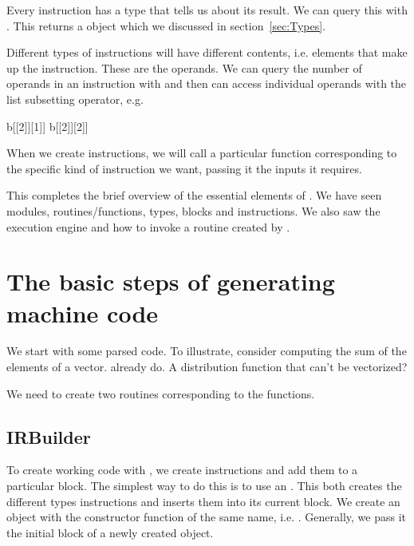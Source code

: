 \documentclass[article]{jss}
\begin{document}
Every instruction has a type that tells us about its result. 
We can query this with . This returns a
 object which we discussed in section~\ref{sec:Types}.

Different types of instructions will have different contents,
i.e. elements that make up the instruction.
These are the operands.
We can query the number of operands in an instruction with 
and then can access individual operands with the  list subsetting
operator, e.g.
\begin{RCode}
b[[2]][1]]
b[[2]][2]]
\end{RCode}
When we create instructions, we will call a particular
function corresponding to the specific kind of instruction
we want, passing it the inputs it requires.


This completes the brief overview of the essential elements of \llvm.
We have seen modules, routines/functions, types, blocks and
instructions.  We also saw the execution engine and how to 
invoke a routine created by \llvm.


\section{The basic steps of generating machine code}

We start with some parsed code.  To illustrate, consider computing the
sum of the elements of a vector. %
already do. A distribution function that can't be vectorized?%

We need to create two routines corresponding to the \R{} functions.






\subsection{IRBuilder}
To create working code with \llvm, we create instructions and add them
to a particular block.  The simplest way to do this is to use an
.  This both creates the different types
instructions and inserts them into its current block.  We create an
 object with the constructor function of the same
name, i.e. .  Generally, we pass it the initial block
of a newly created  object.
\end{document}
